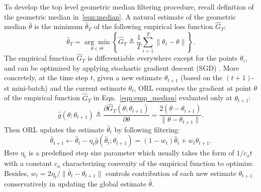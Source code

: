 \documentclass[11pt]{article}
\newtheorem{remark}{Remark}
\begin{document}
To  develop  the top level geometric median filtering procedure, recall  definition of the geometric median in~\eqref{eqn:median}.
A natural estimate of the geometric median $\widehat{\theta}$ is the minimum $ \widehat{\theta}_T $ of the following empirical loss function $\widehat{G}_T$:
\begin{equation}
\label{eqn:emp_median}
\widehat{\theta}_T = \underset{\theta \in \Theta}{\arg\min}  \left\{\widehat{G}_T  \triangleq    \frac{1}{T}\sum_{i=1}^T \|\theta_i-\theta\|\right\}.
\end{equation}
The empirical function  $ \widehat{G}_T $ is differentiable everywhere except for the points $ \theta_i $,
and can be optimized  by applying  stochastic gradient descent (SGD) \cite{bottou1998online}. More concretely, at the time step $ t $, given a new estimate $\theta_{t+1}$ (based on the $(t{+}1)$-st mini-batch)  and the current  estimate $ {\theta}_t $, ORL computes the gradient at point $ \theta $ of the empirical  function $ \widehat{G}_T $  in Eqn.~\eqref{eqn:emp_median} evaluated only at $\theta_{t+1}$:
\begin{equation}
\label{eqn:sgdmed}
\widehat{g}(\theta;\theta_{t+1}) \triangleq  \frac{\partial \widehat{G}_T (\theta;\theta_{t+1})}{\partial \theta} = \frac{2(\theta-\theta_{t+1})}{\|\theta-\theta_{t+1}\|}.
\end{equation}
Then  ORL updates the   estimate $ \widehat{\theta}_t $  by following filtering: %
\begin{equation}
\label{eqn:online-median}
\widehat{\theta}_{t+1} \leftarrow \widehat{\theta}_{t} -  \eta_t \widehat{g}(\widehat{\theta}_{t};\theta_{t+1}) = (1-w_t) \widehat{\theta}_t + w_t {\theta}_{t+1}.
\end{equation}
Here $ \eta_t $ is a predefined step size parameter which usually takes the form of $ 1/c_a t $ with a constant $ c_a $ characterizing  convexity of the empirical function to optimize. Besides, $w_t = 2\eta_t/\|\widehat{\theta}_t - \theta_{t+1}\|$ controls contribution of each new estimate $\theta_{t+1}$  conservatively in  updating the global estimate $\widehat{\theta}$.
\end{document}
